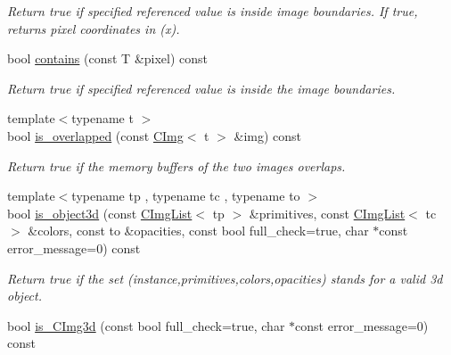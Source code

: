 \begin{DoxyCompactItemize}
\begin{DoxyCompactList}\small\item\em Return {\ttfamily true} if specified referenced value is inside image boundaries. If true, returns pixel coordinates in (x). \item\end{DoxyCompactList}\item 
\hypertarget{structcimg__library_1_1CImg_ac209cb1eac5d34a620140e1fb221605b}{
bool \hyperlink{structcimg__library_1_1CImg_ac209cb1eac5d34a620140e1fb221605b}{contains} (const T \&pixel) const }
\label{structcimg__library_1_1CImg_ac209cb1eac5d34a620140e1fb221605b}

\begin{DoxyCompactList}\small\item\em Return {\ttfamily true} if specified referenced value is inside the image boundaries. \item\end{DoxyCompactList}\item 
\hypertarget{structcimg__library_1_1CImg_ab37041213cf48faf44debd569ae93127}{
{\footnotesize template$<$typename t $>$ }\\bool \hyperlink{structcimg__library_1_1CImg_ab37041213cf48faf44debd569ae93127}{is\_\-overlapped} (const \hyperlink{structcimg__library_1_1CImg}{CImg}$<$ t $>$ \&img) const }
\label{structcimg__library_1_1CImg_ab37041213cf48faf44debd569ae93127}

\begin{DoxyCompactList}\small\item\em Return {\ttfamily true} if the memory buffers of the two images overlaps. \item\end{DoxyCompactList}\item 
\hypertarget{structcimg__library_1_1CImg_a4d9774d299f6c7c0a78b78affe138b1e}{
{\footnotesize template$<$typename tp , typename tc , typename to $>$ }\\bool \hyperlink{structcimg__library_1_1CImg_a4d9774d299f6c7c0a78b78affe138b1e}{is\_\-object3d} (const \hyperlink{structcimg__library_1_1CImgList}{CImgList}$<$ tp $>$ \&primitives, const \hyperlink{structcimg__library_1_1CImgList}{CImgList}$<$ tc $>$ \&colors, const to \&opacities, const bool full\_\-check=true, char $\ast$const error\_\-message=0) const }
\label{structcimg__library_1_1CImg_a4d9774d299f6c7c0a78b78affe138b1e}

\begin{DoxyCompactList}\small\item\em Return true if the set (instance,primitives,colors,opacities) stands for a valid 3d object. \item\end{DoxyCompactList}\item 
\hypertarget{structcimg__library_1_1CImg_a7ee10e8d201458f386552fdcdbe68b95}{
bool \hyperlink{structcimg__library_1_1CImg_a7ee10e8d201458f386552fdcdbe68b95}{is\_\-CImg3d} (const bool full\_\-check=true, char $\ast$const error\_\-message=0) const }
\label{structcimg__library_1_1CImg_a7ee10e8d201458f386552fdcdbe68b95}


\end{DoxyCompactItemize}
